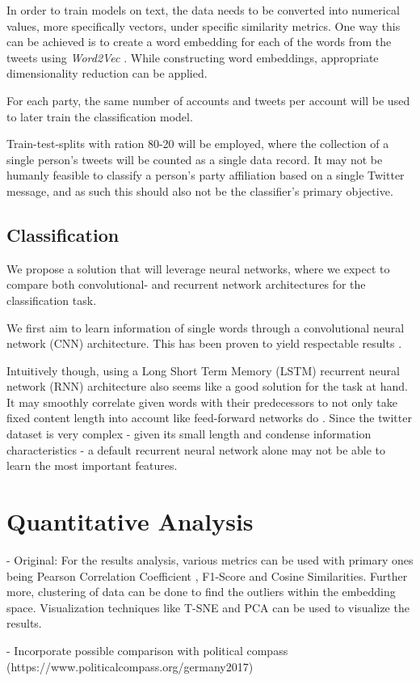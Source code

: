 \documentclass[10pt, oneside]{article}
\begin{document}
\begin{multicols}{2}
In order to train models on text, the data needs to be converted into numerical values, more specifically vectors, under specific similarity metrics. One way this can be achieved is to create a word embedding for each of the words from the tweets using \textit{Word2Vec} \cite{DBLP:journals/corr/abs-1301-3781}. While constructing word embeddings, appropriate dimensionality reduction can be applied.

For each party, the same number of accounts and tweets per account will be used to later train the classification model.

Train-test-splits with ration 80-20 will be employed, where the collection of a single person's tweets will be counted as a single data record. It may not be humanly feasible to classify a person's party affiliation based on a single Twitter message, and as such this should also not be the classifier's primary objective.

\subsection{Classification}

We propose a solution that will leverage neural networks, where we expect to compare both convolutional- and recurrent network architectures for the classification task.

We first aim to learn information of single words through a convolutional neural network (CNN) architecture. This has been proven to yield respectable results \cite{Kim2014}.

Intuitively though, using a Long Short Term Memory (LSTM) recurrent neural network (RNN) architecture also seems like a good solution for the task at hand. It may smoothly correlate given words with their predecessors to not only take fixed content length into account like feed-forward networks do \cite{Sundermeyer2012lstm}.
Since the twitter dataset is very complex - given its small length and condense information characteristics - a default recurrent neural network alone may not be able to learn the most important features.


\section{Quantitative Analysis}

- Original: For the results analysis, various metrics can be used with primary ones being Pearson Correlation Coefficient \cite{Hauke2011}, F1-Score and Cosine Similarities. Further more, clustering of data can be done to find the outliers within the embedding space. Visualization techniques like T-SNE \cite{Laurens2008} and PCA \cite{Richardson2009} can be used to visualize the results. 

- Incorporate possible comparison with political compass (https://www.politicalcompass.org/germany2017)

\end{multicols}
\newpage
\end{document}
